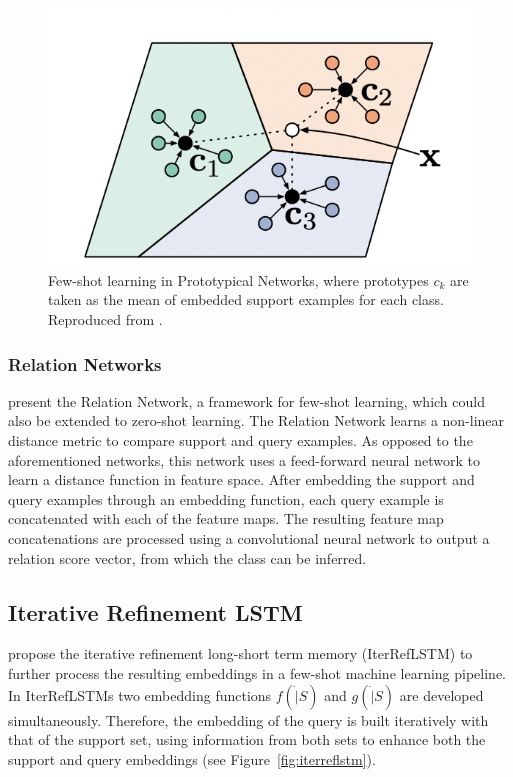 \documentclass[journal=acscii,manuscript=article]{achemso}
\begin{document}
\begin{figure}[h]
\centering
\includegraphics[width=0.7\linewidth]{img/protonets.png}
\caption{Few-shot learning in Prototypical Networks, where prototypes \textbf{$c_k$} are taken as the mean of embedded support examples for each class. Reproduced from \citet{snell2017prototypical}.}
\label{fig:protonets}
\end{figure}

\subsubsection{Relation Networks}

\citet{sung2018learning} present the Relation Network, a framework for few-shot learning, which could also be extended to zero-shot learning. The Relation Network learns a non-linear distance metric to compare support and query examples. As opposed to the aforementioned networks, this network uses a feed-forward neural network to learn a distance function in feature space. After embedding the support and query examples through an embedding function, each query example is concatenated with each of the feature maps. The resulting feature map concatenations are processed using a convolutional neural network to output a relation score vector, from which the class can be inferred.

\subsection{Iterative Refinement LSTM}

\citet{altae2017low} propose the iterative refinement long-short term memory (IterRefLSTM) to further process the resulting embeddings in a few-shot machine learning pipeline. In IterRefLSTMs two embedding functions $f(\dot|S)$ and $g(\dot|S)$ are developed simultaneously. Therefore, the embedding of the query is built iteratively with that of the support set, using information from both sets to enhance both the support and query embeddings (see Figure~\ref{fig:iterreflstm}).
\end{document}
